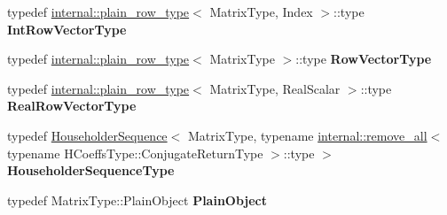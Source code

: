 \begin{DoxyCompactItemize}
\mbox{\label{class_eigen_1_1_col_piv_householder_q_r_a6a936341a807b4c526edeae544ed3c50}} 
typedef \mbox{\hyperlink{struct_eigen_1_1internal_1_1plain__row__type}{internal\+::plain\+\_\+row\+\_\+type}}$<$ Matrix\+Type, Index $>$\+::type {\bfseries Int\+Row\+Vector\+Type}
\item 
\mbox{\label{class_eigen_1_1_col_piv_householder_q_r_ad2e5d38156d09b36f4c57b7746092ad1}} 
typedef \mbox{\hyperlink{struct_eigen_1_1internal_1_1plain__row__type}{internal\+::plain\+\_\+row\+\_\+type}}$<$ Matrix\+Type $>$\+::type {\bfseries Row\+Vector\+Type}
\item 
\mbox{\label{class_eigen_1_1_col_piv_householder_q_r_afb69477038a2efe1a09072fa46030be9}} 
typedef \mbox{\hyperlink{struct_eigen_1_1internal_1_1plain__row__type}{internal\+::plain\+\_\+row\+\_\+type}}$<$ Matrix\+Type, Real\+Scalar $>$\+::type {\bfseries Real\+Row\+Vector\+Type}
\item 
\mbox{\label{class_eigen_1_1_col_piv_householder_q_r_a55b37f691cf7c54edd525b551eefe566}} 
typedef \mbox{\hyperlink{class_eigen_1_1_householder_sequence}{Householder\+Sequence}}$<$ Matrix\+Type, typename \mbox{\hyperlink{struct_eigen_1_1internal_1_1remove__all}{internal\+::remove\+\_\+all}}$<$ typename H\+Coeffs\+Type\+::\+Conjugate\+Return\+Type $>$\+::type $>$ {\bfseries Householder\+Sequence\+Type}
\item 
\mbox{\label{class_eigen_1_1_col_piv_householder_q_r_aa3945dfd3f2109bd7f26a4acefe9f769}} 
typedef Matrix\+Type\+::\+Plain\+Object {\bfseries Plain\+Object}
\end{DoxyCompactItemize}
